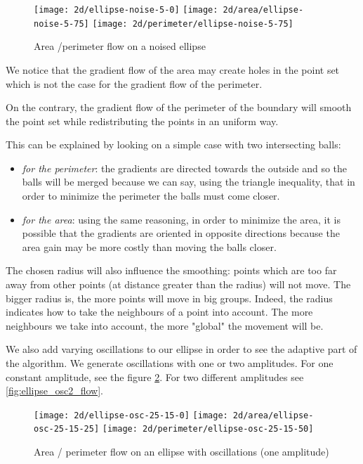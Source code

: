\begin{figure}[h]
    \centering

    \texttt{[image: 2d/ellipse-noise-5-0]}
    \texttt{[image: 2d/area/ellipse-noise-5-75]}
    \texttt{[image: 2d/perimeter/ellipse-noise-5-75]}
    \caption{Area /perimeter flow on a noised ellipse}

    \label{fig:ellipse_noise_flow}
\end{figure}

We notice that the gradient flow of the area may create holes in the point set
which is not the case for the gradient flow of the perimeter.

On the contrary, the gradient flow of the perimeter of the boundary will smooth
the point set while redistributing the points in an uniform way.

This can be explained by looking on a simple case with two intersecting balls:
\begin{itemize}
    \item \textit{for the perimeter}: the gradients are directed towards the outside
        and so the balls will be merged because we can say, using the triangle
        inequality, that in order to minimize the perimeter the balls must come
        closer.
    \item \textit{for the area}: using the same reasoning, in order to minimize the area,
        it is possible that the gradients are oriented in opposite directions
        because the area gain may be more costly than moving the balls closer.
\end{itemize}

The chosen radius will also influence the smoothing: points which are too far
away from other points (at distance greater than the radius) will not move. The
bigger radius is, the more points will move in big groups. Indeed, the
radius indicates how to take the neighbours of a point into account. The more
neighbours we take into account, the more "global" the movement will be.

We also add varying oscillations to our ellipse in order to see the adaptive
part of the algorithm. We generate oscillations with one or two amplitudes. For
one constant amplitude, see the figure \ref{fig:ellipse_osc_flow}. For two
different amplitudes see \ref{fig:ellipse_osc2_flow}.

\begin{figure}[h]
    \centering

    \texttt{[image: 2d/ellipse-osc-25-15-0]}
    \texttt{[image: 2d/area/ellipse-osc-25-15-25]}
    \texttt{[image: 2d/perimeter/ellipse-osc-25-15-50]}
    \caption{Area / perimeter flow on an ellipse with oscillations (one
        amplitude)}

    \label{fig:ellipse_osc_flow}
\end{figure}

